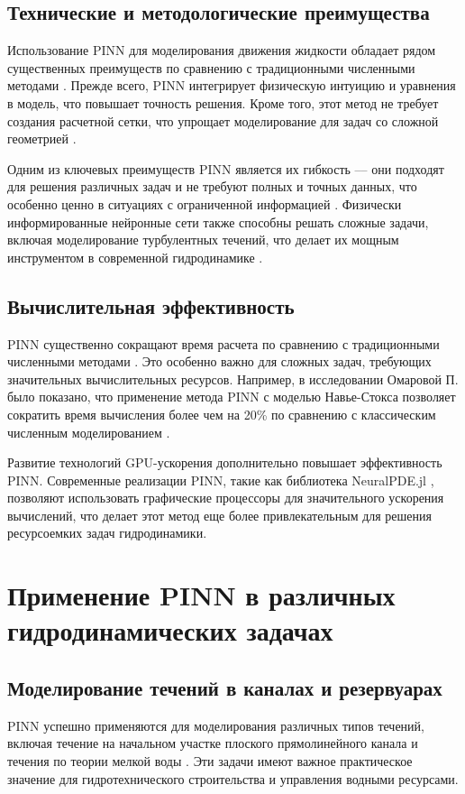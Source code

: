 \subsection{Технические и методологические преимущества}
Использование PINN для моделирования движения жидкости обладает рядом существенных преимуществ по сравнению
с традиционными численными методами \cite{cuomo2022scientific}. Прежде всего, PINN интегрирует физическую
интуицию и уравнения в модель, что повышает точность решения. Кроме того, этот метод не требует создания
расчетной сетки, что упрощает моделирование для задач со сложной геометрией \cite{cai2021physics}.

Одним из ключевых преимуществ PINN является их гибкость –-- они подходят для решения различных задач и
не требуют полных и точных данных, что особенно ценно в ситуациях с ограниченной
информацией \cite{karniadakis2021physics}. Физически информированные нейронные сети также способны решать
сложные задачи, включая моделирование турбулентных течений, что делает их мощным инструментом в современной
гидродинамике \cite{mao2020physics}.

\subsection{Вычислительная эффективность}
PINN существенно сокращают время расчета по сравнению с традиционными численными
методами \cite{jagtap2020conservative}. Это особенно важно для сложных задач, требующих значительных вычислительных
ресурсов. Например, в исследовании Омаровой П. было показано, что применение метода PINN с моделью Навье-Стокса
позволяет сократить время вычисления более чем на 20\% по сравнению с классическим численным
моделированием \cite{omarova2022pinn}.

Развитие технологий GPU-ускорения дополнительно повышает эффективность PINN. Современные реализации PINN, такие
как библиотека NeuralPDE.jl \cite{neuralpde2023}, позволяют использовать графические процессоры для значительного
ускорения вычислений, что делает этот метод еще более привлекательным для решения ресурсоемких задач гидродинамики.

\section{Применение PINN в различных гидродинамических задачах}
\subsection{Моделирование течений в каналах и резервуарах}
PINN успешно применяются для моделирования различных типов течений, включая течение на начальном участке плоского
прямолинейного канала и течения по теории мелкой воды \cite{fang2021high}. Эти задачи имеют важное практическое
значение для гидротехнического строительства и управления водными ресурсами.


